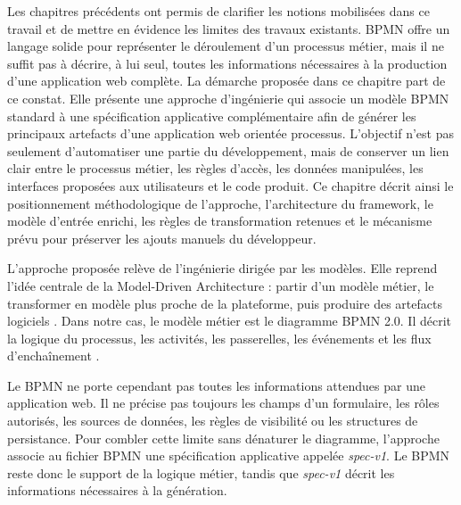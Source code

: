 \label{chap:approche-prooweb}


Les chapitres précédents ont permis de clarifier les notions mobilisées dans ce travail et de mettre en évidence les limites des travaux existants. BPMN offre un langage solide pour représenter le déroulement d'un processus métier, mais il ne suffit pas à décrire, à lui seul, toutes les informations nécessaires à la production d'une application web complète. La démarche proposée dans ce chapitre part de ce constat. Elle présente une approche d'ingénierie qui associe un modèle BPMN standard à une spécification applicative complémentaire afin de générer les principaux artefacts d'une application web orientée processus. L'objectif n'est pas seulement d'automatiser une partie du développement, mais de conserver un lien clair entre le processus métier, les règles d'accès, les données manipulées, les interfaces proposées aux utilisateurs et le code produit. Ce chapitre décrit ainsi le positionnement méthodologique de l'approche, l'architecture du framework, le modèle d'entrée enrichi, les règles de transformation retenues et le mécanisme prévu pour préserver les ajouts manuels du développeur.


L'approche proposée relève de l'ingénierie dirigée par les modèles. Elle reprend l'idée centrale de la Model-Driven Architecture : partir d'un modèle métier, le transformer en modèle plus proche de la plateforme, puis produire des artefacts logiciels \cite{omg2014mda,jezequel2012}. Dans notre cas, le modèle métier est le diagramme BPMN 2.0. Il décrit la logique du processus, les activités, les passerelles, les événements et les flux d'enchaînement \cite{omg2013bpmn}.

Le BPMN ne porte cependant pas toutes les informations attendues par une application web. Il ne précise pas toujours les champs d'un formulaire, les rôles autorisés, les sources de données, les règles de visibilité ou les structures de persistance. Pour combler cette limite sans dénaturer le diagramme, l'approche associe au fichier BPMN une spécification applicative appelée \textit{spec-v1}. Le BPMN reste donc le support de la logique métier, tandis que \textit{spec-v1} décrit les informations nécessaires à la génération.


